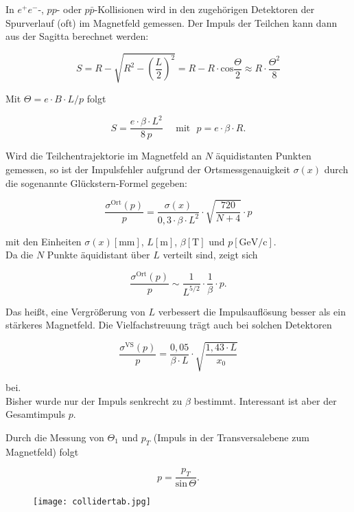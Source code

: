In $e^+e^-$-, $pp$- oder $p\bar{p}$-Kollisionen wird in den zugehörigen Detektoren der Spurverlauf
(oft) im Magnetfeld gemessen. Der Impuls der Teilchen kann dann aus der Sagitta berechnet werden:

\begin{figure}[H]
		\centering
		
\end{figure} 

\[S= R-\sqrt{R^2-\left(\frac{L}{2} \right)^2} = R-R\cdot\text{cos}\frac{\Theta}{2}\approx R\cdot
\frac{\Theta^2}{8} \]

Mit $\Theta = e\cdot B\cdot L/p$ folgt

\[S= \frac{e\cdot\beta\cdot L^2}{8\,p}~~~~~~\text{mit}~~~p=e\cdot\beta\cdot R. \]

Wird die Teilchentrajektorie im Magnetfeld an $N$ äquidistanten Punkten gemessen, so ist der
Impulsfehler aufgrund der Ortsmessgenauigkeit $\sigma(x)$ durch die sogenannte Glückstern-Formel
gegeben:

\[ \frac{\sigma^{\text{Ort}}(p)}{p} = \frac{\sigma(x)}{0{,}3\cdot\beta\cdot L^2}\cdot
\sqrt{\frac{720}{N+4}}\cdot p \]

mit den Einheiten $\sigma(x)\left[\text{mm} \right]$, $L\left[\text{m} \right]$,
$\beta\left[\text{T} \right]$ und $p\left[\text{GeV/c} \right]$.
\\
Da die $N$ Punkte äquidistant über $L$ verteilt sind, zeigt sich

\[ \frac{\sigma^{\text{Ort}}(p)}{p} \sim \frac{1}{L^{5/2}}\cdot \frac{1}{\beta}\cdot p .\]

Das heißt, eine Vergrößerung von $L$ verbessert die Impulsauflösung besser als ein stärkeres
Magnetfeld. Die Vielfachstreuung trägt auch bei solchen Detektoren

\[\frac{\sigma^{\text{VS}}(p)}{p} = \frac{0{,}05}{\beta \cdot L}\cdot \sqrt{\frac{1{,}43\cdot
L}{x_0}} \]

bei. 
\\
Bisher wurde nur der Impuls senkrecht zu $\beta$ bestimmt. Interessant ist aber der Gesamtimpuls
$p$.  

\begin{figure}[H]
		\centering
		
\end{figure} 

Durch die Messung von $\Theta_1$ und $p_T$ (Impuls in der Transversalebene zum Mag\-netfeld) folgt

\[p=\frac{p_T}{\text{sin}\,\Theta} .\]

\begin{figure}[H]
	\centering
	\texttt{[image: collidertab.jpg]}
\end{figure}